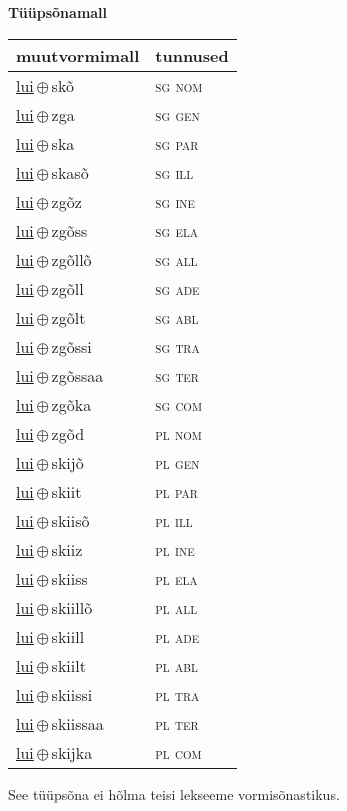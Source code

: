 

\vspace{3.5em}
\noindent \begin{minipage}{\textwidth}
\noindent \textbf{Tüüpsõnamall \,}\\

\begin{sideways}
\begin{tabular}{l l}
muutvormimall & tunnused \\
\hline
\underline{lui}\,$\oplus$\,skõ & \textsc{ sg nom } \\
\underline{lui}\,$\oplus$\,zga & \textsc{ sg gen } \\
\underline{lui}\,$\oplus$\,ska & \textsc{ sg par } \\
\underline{lui}\,$\oplus$\,skasõ & \textsc{ sg ill } \\
\underline{lui}\,$\oplus$\,zgõz & \textsc{ sg ine } \\
\underline{lui}\,$\oplus$\,zgõss & \textsc{ sg ela } \\
\underline{lui}\,$\oplus$\,zgõllõ & \textsc{ sg all } \\
\underline{lui}\,$\oplus$\,zgõll & \textsc{ sg ade } \\
\underline{lui}\,$\oplus$\,zgõlt & \textsc{ sg abl } \\
\underline{lui}\,$\oplus$\,zgõssi & \textsc{ sg tra } \\
\underline{lui}\,$\oplus$\,zgõssaa & \textsc{ sg ter } \\
\underline{lui}\,$\oplus$\,zgõka & \textsc{ sg com } \\
\underline{lui}\,$\oplus$\,zgõd & \textsc{ pl nom } \\
\underline{lui}\,$\oplus$\,skijõ & \textsc{ pl gen } \\
\underline{lui}\,$\oplus$\,skiit & \textsc{ pl par } \\
\underline{lui}\,$\oplus$\,skiisõ & \textsc{ pl ill } \\
\underline{lui}\,$\oplus$\,skiiz & \textsc{ pl ine } \\
\underline{lui}\,$\oplus$\,skiiss & \textsc{ pl ela } \\
\underline{lui}\,$\oplus$\,skiillõ & \textsc{ pl all } \\
\underline{lui}\,$\oplus$\,skiill & \textsc{ pl ade } \\
\underline{lui}\,$\oplus$\,skiilt & \textsc{ pl abl } \\
\underline{lui}\,$\oplus$\,skiissi & \textsc{ pl tra } \\
\underline{lui}\,$\oplus$\,skiissaa & \textsc{ pl ter } \\
\underline{lui}\,$\oplus$\,skijka & \textsc{ pl com } \\
\end{tabular}
\end{sideways}
\label{tab:tüüpsõnamall-luiskõ}

\end{minipage}

 
\vspace{1em}
\noindent See tüüpsõna ei hõlma teisi lekseeme vormi\-sõnastikus.
